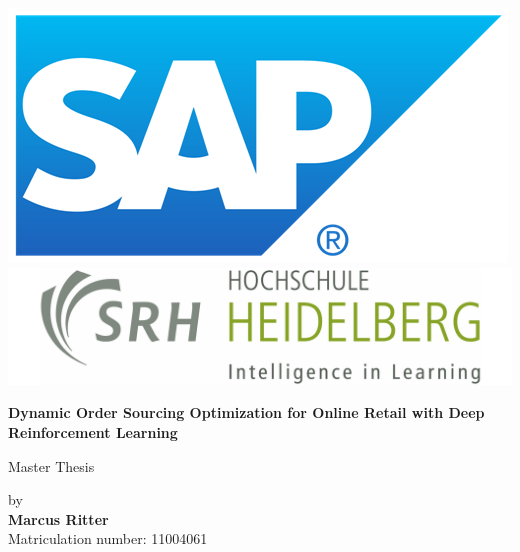 \begin{titlepage}
\label{sec:title_page}


\includegraphics[scale=0.175]{Figures/sap_logo.png}\hfill\includegraphics[scale=0.4]{Figures/srh_logo.png}\\ 
\vspace{2em}
\begin{center}
\begin{huge}
\begin{onehalfspace}
\textbf{Dynamic Order Sourcing Optimization for Online Retail with Deep Reinforcement Learning}
\end{onehalfspace}
\end{huge}

\vspace{6em}

{\huge Master Thesis}\\

\vspace{1em}

{\LARGE by}\\

\vspace{1em}
\huge{\textbf{Marcus Ritter}}\\

\vspace{1em}
\Large{Matriculation number: 11004061}\\


\end{center}
\end{titlepage}
